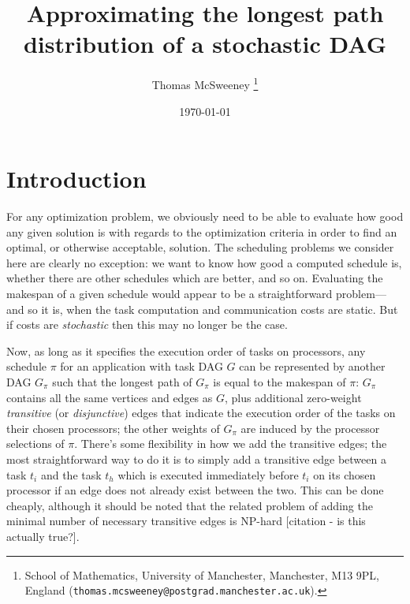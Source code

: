 \documentclass[12pt]{article}
\title{Approximating the longest path distribution of a stochastic DAG} %
\author{Thomas McSweeney%
	\thanks{%
		School of Mathematics,
		University of Manchester,
		Manchester, M13 9PL, England
		(\texttt{thomas.mcsweeney@postgrad.manchester.ac.uk}).
	}
}
\date{\today}
\begin{document}
	\maketitle 	


\section{Introduction}
\label{sect.intro}


For any optimization problem, we obviously need to be able to evaluate how good any given solution is with regards to the optimization criteria in order to find an optimal, or otherwise acceptable, solution. The scheduling problems we consider here are clearly no exception: we want to know how good a computed schedule is, whether there are other schedules which are better, and so on. Evaluating the makespan of a given schedule would appear to be a straightforward problem---and so it is, when the task computation and communication costs are static. But if costs are {\em stochastic} then this may no longer be the case.

Now, as long as it specifies the execution order of tasks on processors, any schedule $\pi$ for an application with task DAG $G$ can be represented by another DAG $G_{\pi}$ such that the longest path of $G_{\pi}$ is equal to the makespan of $\pi$: $G_\pi$ contains all the same vertices and edges as $G$, plus additional zero-weight {\em transitive} (or {\em disjunctive}) edges that indicate the execution order of the tasks on their chosen processors; the other weights of $G_\pi$ are induced by the processor selections of $\pi$. There's some flexibility in how we add the transitive edges; the most straightforward way to do it is to simply add a transitive edge between a task $t_i$ and the task $t_h$ which is executed immediately before $t_i$ on its chosen processor if an edge does not already exist between the two. This can be done cheaply, although it should be noted that the related problem of adding the minimal number of necessary transitive edges is NP-hard [citation - is this actually true?]. 
\end{document}
